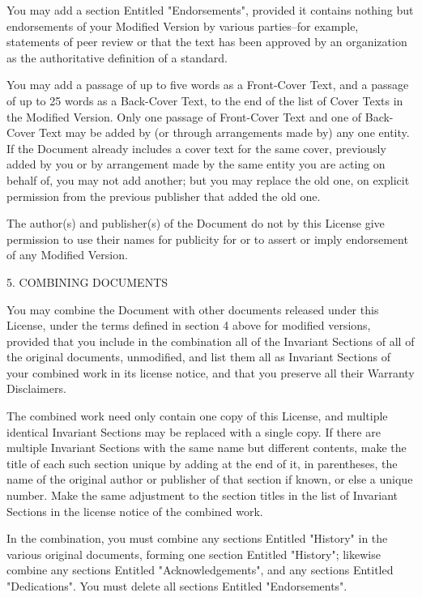 \documentclass{article}
\begin{document}
You may add a section Entitled "Endorsements", provided it contains nothing but endorsements of your Modified Version by various parties--for example, statements of peer review or that the text has been approved by an organization as the authoritative definition of a standard. 

You may add a passage of up to five words as a Front-Cover Text, and a passage of up to 25 words as a Back-Cover Text, to the end of the list of Cover Texts in the Modified Version.  Only one passage of Front-Cover Text and one of Back-Cover Text may be added by (or through  arrangements made by) any one entity. If the Document already includes a cover text for the same cover, previously added by you or by arrangement made by the same entity you are acting on behalf of, you may not add another; but you may replace the old one, on explicit permission from the previous publisher that added the old one. 

The author(s) and publisher(s) of the Document do not by this License give permission to use their names for publicity for or to assert or imply endorsement of any Modified Version. 

5. COMBINING DOCUMENTS 

You may combine the Document with other documents released under this License, under the terms defined in section 4 above for modified versions, provided that you include in the combination all of the Invariant Sections of all of the original documents, unmodified, and list them all as Invariant Sections of your combined work in its license notice, and that you preserve all their Warranty Disclaimers. 

The combined work need only contain one copy of this License, and multiple identical Invariant Sections may be replaced with a single copy. If there are multiple Invariant Sections with the same name but different contents, make the title of each such section unique by adding at the end of it, in parentheses, the name of the original author or publisher of that section if known, or else a unique number. Make the same adjustment to the section titles in the list of Invariant Sections in the license notice of the combined work. 

In the combination, you must combine any sections Entitled "History" in the various original documents, forming one section Entitled "History"; likewise combine any sections Entitled "Acknowledgements", and any sections Entitled "Dedications".  You must delete all sections Entitled "Endorsements". 
\end{document}
